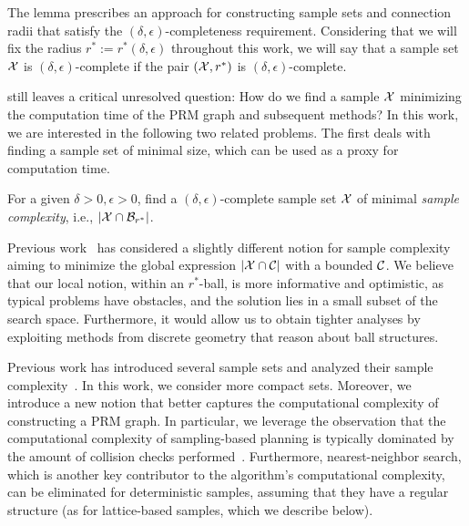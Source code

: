 The lemma prescribes an approach for constructing sample sets and connection radii that satisfy the $(\delta,\epsilon)$-completeness requirement. %
Considering that we will fix the radius $r^*:=r^*(\delta,\epsilon)$ throughout this work, we will say that a sample set $\mathcal{X}$ is $(\delta,\epsilon)$-complete if the pair $(\mathcal{X},r^*)$ is $(\delta,\epsilon)$-complete.

 still leaves a critical unresolved question: How do we find a \decomp sample $\mathcal{X}$ minimizing the computation time of the PRM graph and subsequent methods? In this work, we are interested in the following two related problems. The first deals with finding a sample set of minimal size, which can be used as a proxy for computation time. 

\begin{problem}\label{problem:sample}
  For a given $\delta>0,\epsilon>0$, find a $(\delta,\epsilon)$-complete sample set $\mathcal{X}$ of  minimal \emph{sample complexity}, i.e., $|\mathcal{X}\cap \mathcal{B}_{r^*}|$. 
\end{problem}

Previous work~\cite{tsao2020sample,dayan2023near} has considered a slightly different notion for sample complexity aiming to minimize the global expression $|\mathcal{X}\cap \mathcal{C}|$ with a bounded $\mathcal{C}$. We believe that our local notion, within an ${r^*}$-ball, is more informative and optimistic, as typical problems have obstacles, and the solution lies in a small subset of the search space. Furthermore, it would allow us to obtain tighter analyses by exploiting methods from discrete geometry that reason about ball structures.

Previous work has introduced several sample sets and analyzed their sample complexity~\cite{tsao2020sample,dayan2023near}. In this work, we consider more compact sets. Moreover, we introduce a new notion that better captures the computational complexity of constructing a PRM graph. In particular, we leverage the observation that the computational complexity of sampling-based planning is typically dominated by the amount of collision checks performed~\cite{KleinbortSH16}. Furthermore, nearest-neighbor search, which is another key contributor to the algorithm's computational complexity, 
can be eliminated for deterministic samples, assuming that they have a regular structure (as for lattice-based samples, which we describe below).

